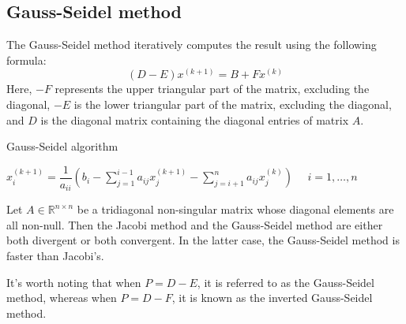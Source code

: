 \subsection*{Gauss-Seidel method}
The Gauss-Seidel method iteratively computes the result using the following formula:
\[\left(D-E\right)x^{(k+1)}=B+Fx^{(k)}\]
Here, $-F$ represents the upper triangular part of the matrix, excluding the diagonal, $-E$ is the lower triangular part of the matrix, excluding the diagonal, and $D$ is the diagonal matrix containing the diagonal entries of matrix $A$.
\begin{algorithm}[H]
    \caption{Gauss-Seidel algorithm}
        \begin{algorithmic}[1]
            \State $x_i^{(k+1)}=\dfrac{1}{a_{ii}}\left( b_i-\sum_{j=1}^{i-1}a_{ij}x_j^{(k+1)}-\sum_{j=i+1}^{n}a_{ij}x_j^{(k)}\right) \:\:\:\:\:\: i=1,\dots,n $
        \end{algorithmic}
\end{algorithm}
\begin{proposition}
    Let $A \in \mathbb{R}^{n \times n}$ be a tridiagonal non-singular matrix whose diagonal elements are all non-null. 
    Then the Jacobi method and the Gauss-Seidel method are either both divergent or both convergent. 
    In the latter case, the Gauss-Seidel method is faster than Jacobi's. 
\end{proposition}
It's worth noting that when $P=D-E$, it is referred to as the Gauss-Seidel method, whereas when $P=D-F$, it is known as the inverted Gauss-Seidel method.

